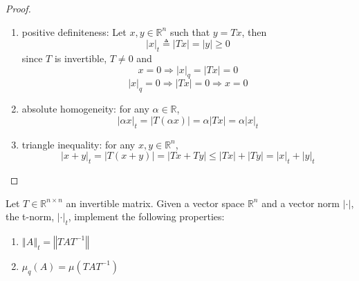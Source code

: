 \documentclass[12pt,English]{article}
\begin{document}
\begin{proof}\hfill
\begin{enumerate}
        \item positive definiteness: Let $x,y\in\mathbb{R}^{n}$ such that $y=Tx$, then $$\left|x\right|_{t}\triangleq\left|Tx\right|=\left|y\right|\geq0$$
        since $T$ is invertible, $T\ne0$ and
        $$x=0 \Rightarrow \left|x\right|_{q}=\left|Tx\right|=0$$
        $$\left|x\right|_{q}=0 \Rightarrow \left|Tx\right|=0 \Rightarrow x=0$$ 
        
        \item absolute homogeneity: for any $\alpha\in\mathbb{R}$, 
        $$\left|\alpha x\right|_{t}=\left|T\left(\alpha x\right)\right| =\alpha\left|Tx\right|=\alpha\left|x\right|_{t}$$
        
        \item triangle inequality: for any $x,y\in\mathbb{R}^{n}$,
        $$\left|x+y\right|_{t}=\left|T\left(x+y\right)\right|=\left|Tx+Ty\right|\leq\left|Tx\right|+\left|Ty\right|=\left|x\right|_{t}+\left|y\right|_{t}$$

    \end{enumerate}
\end{proof}


\begin{lem}
Let $T\in\mathbb{R}^{n\times n}$ an invertible matrix.
Given a vector space $\mathbb{R}^{n}$ and a vector norm $\left|\cdot\right|$, the t-norm, $\left|\cdot\right|_{t}$, implement the following properties:
\begin{enumerate}
    \item $\left\Vert A\right\Vert _{t}=\left\Vert TAT^{-1}\right\Vert$
    \item $\mu_{q}\left(A\right)=\mu\left(TAT^{-1}\right)$
\end{enumerate}
\end{lem}
\end{document}
